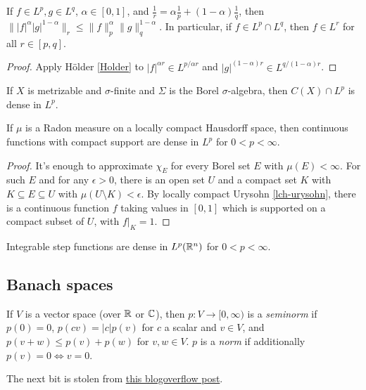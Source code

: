 \documentclass[letterpaper,11pt]{report}
\begin{document}
\begin{prop} If $f \in L^p, g \in L^q$, $\alpha \in [0,1]$, and $\frac{1}{r} = \alpha \frac{1}{p} + (1-\alpha) \frac{1}{q}$, then $\||f|^{\alpha}|g|^{1-\alpha}\|_r \le \|f\|_p^{\alpha}\|g\|_q^{1-\alpha}$. In particular, if $f \in L^p\cap L^q$, then $f \in L^r$ for all $r \in [p,q]$.
\end{prop}
\begin{proof} Apply H\"older \ref{Holder} to $|f|^{\alpha r} \in L^{p/\alpha r}$ and $|g|^{(1-\alpha)r} \in L^{q/(1-\alpha)r}$.
\end{proof}

\begin{prop} If $X$ is metrizable and $\sigma$-finite and $\Sigma$ is the Borel $\sigma$-algebra, then $C(X) \cap L^p$ is dense in $L^p$.
\end{prop}

\begin{prop} If $\mu$ is a Radon measure on a locally compact Hausdorff space, then continuous functions with compact support are dense in $L^p$ for $0 < p < \infty$.
\end{prop}
\begin{proof} It's enough to approximate $\chi_E$ for every Borel set $E$ with $\mu(E) < \infty$. For such $E$ and for any $\epsilon > 0$, there is an open set $U$ and a compact set $K$ with $K \subseteq E \subseteq U$ with $\mu(U\setminus K) < \epsilon$. By locally compact Urysohn \ref{lch-urysohn}, there is a continuous function $f$ taking values in $[0,1]$ which is supported on a compact subset of $U$, with $f|_K = 1$.
\end{proof}

\begin{cor} Integrable step functions are dense in $L^p(\mathbb{R}^n)$ for $0 < p < \infty$.
\end{cor}


\subsection{Banach spaces}

\begin{defn} If $V$ is a vector space (over $\mathbb{R}$ or $\mathbb{C}$), then $p:V \rightarrow [0,\infty)$ is a \emph{seminorm} if $p(0) = 0$, $p(cv) = |c|p(v)$ for $c$ a scalar and $v\in V$, and $p(v+w) \le p(v) + p(w)$ for $v,w \in V$. $p$ is a \emph{norm} if additionally $p(v) = 0 \iff v = 0$.
\end{defn}

The next bit is stolen from \href{https://math.blogoverflow.com/2014/06/25/zabreikos-lemma-and-four-fundamental-theorems-of-functional-analysis/}{this blogoverflow post}.
\end{document}

